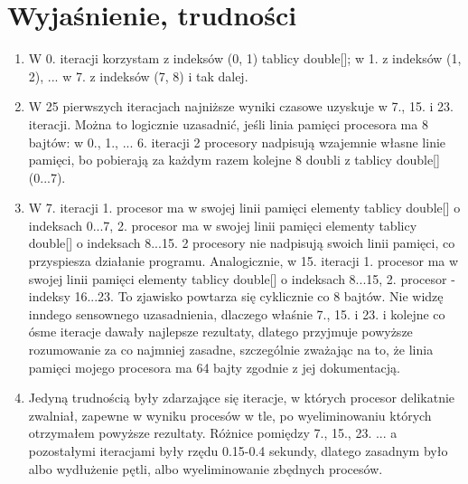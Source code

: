 \documentclass[12pt]{article}
\begin{document}
\section{Wyjaśnienie, trudności}
\begin{enumerate}
	\item W 0. iteracji korzystam z indeksów (0, 1) tablicy double[]; w 1. z indeksów (1, 2), ... w 7. z indeksów (7, 8) i tak dalej.
	\item W 25 pierwszych iteracjach najniższe wyniki czasowe uzyskuje w 7., 15. i 23. iteracji. Można to logicznie uzasadnić, jeśli linia pamięci procesora ma 8 bajtów: w 0., 1., ... 6. iteracji 2 procesory nadpisują wzajemnie własne linie pamięci, bo pobierają za każdym razem kolejne 8 doubli z tablicy double[] (0...7). 
	\item W 7. iteracji 1. procesor ma w swojej linii pamięci elementy tablicy double[] o indeksach 0...7, 2. procesor ma w swojej linii pamięci elementy tablicy double[] o indeksach 8...15. 2 procesory nie nadpisują swoich linii pamięci, co przyspiesza działanie programu. Analogicznie, w 15. iteracji 1. procesor ma w swojej linii pamięci elementy tablicy double[] o indeksach 8...15, 2. procesor - indeksy 16...23. To zjawisko powtarza się cyklicznie co 8 bajtów. Nie widzę inndego sensownego uzasadnienia, dlaczego właśnie 7., 15. i 23. i kolejne co ósme iteracje dawały najlepsze rezultaty, dlatego przyjmuje powyższe rozumowanie za co najmniej zasadne, szczególnie zważając na to, że linia pamięci mojego procesora ma 64 bajty zgodnie z jej dokumentacją.
	\item Jedyną trudnością były zdarzające się iteracje, w których procesor delikatnie zwalniał, zapewne w wyniku procesów w tle, po wyeliminowaniu których otrzymałem powyższe rezultaty. Różnice pomiędzy 7., 15., 23. ... a pozostałymi iteracjami były rzędu 0.15-0.4 sekundy, dlatego zasadnym było albo wydłużenie pętli, albo wyeliminowanie zbędnych procesów.
\end{enumerate}
\end{document}
